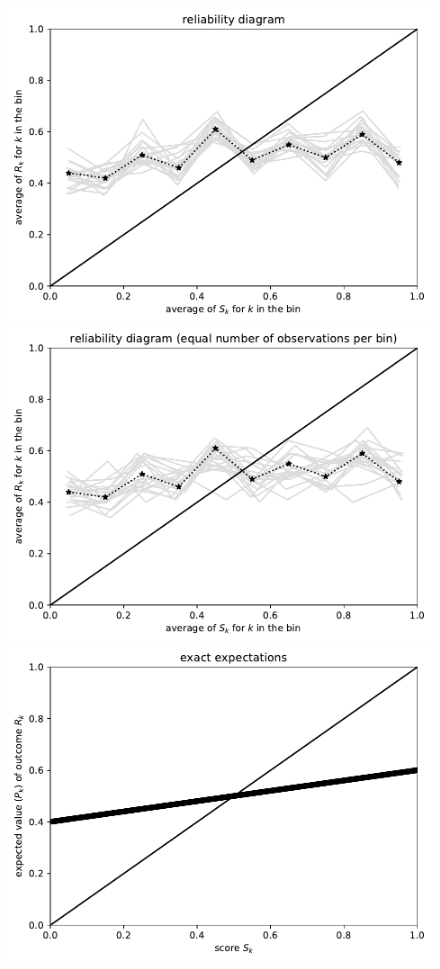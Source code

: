 \documentclass{article}
\begin{document}
\begin{figure}
\begin{centering}
\parbox{\imsize}{\includegraphics[width=\imsize]
                {./codes/unweighted/1000_10_0_0/equiprob.pdf}}
\quad\quad
\parbox{\imsize}{\includegraphics[width=\imsize]
                {./codes/unweighted/1000_10_0_0/equisamp.pdf}}

\vspace{\vertsep}

\parbox{\imsize}{\includegraphics[width=\imsize]
                {./codes/unweighted/1000_10_0_0/exact.pdf}}


\end{centering}
\end{figure}
\end{document}
